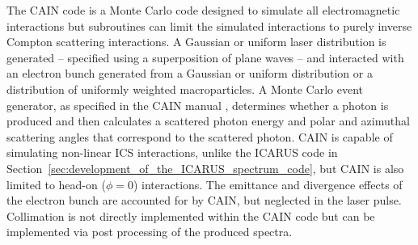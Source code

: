 \documentclass[../main.tex]{subfiles}
\begin{document}
The \textsc{CAIN} code is a Monte Carlo  code designed to simulate all electromagnetic interactions but subroutines can limit the simulated interactions to purely inverse Compton scattering interactions. A Gaussian or uniform laser distribution is generated -- specified using a superposition of plane waves -- and interacted with an electron bunch generated from a Gaussian or uniform distribution or a distribution of uniformly weighted macroparticles. A Monte Carlo event generator, as specified in the \textsc{CAIN} manual \cite{yokoya2003users}, determines whether a photon is produced and then calculates a scattered photon energy and polar and azimuthal scattering angles that correspond to the scattered photon. \textsc{CAIN} is capable of simulating non-linear ICS interactions, unlike the \textsc{ICARUS} code in Section~\ref{sec:development_of_the_ICARUS_spectrum_code}, but \textsc{CAIN} is also limited to head-on ($\phi=0$) interactions. The emittance and divergence effects of the electron bunch are accounted for by \textsc{CAIN}, but neglected in the laser pulse. Collimation is not directly implemented within the \textsc{CAIN} code but can be implemented via post processing of the produced spectra. 
\end{document}
